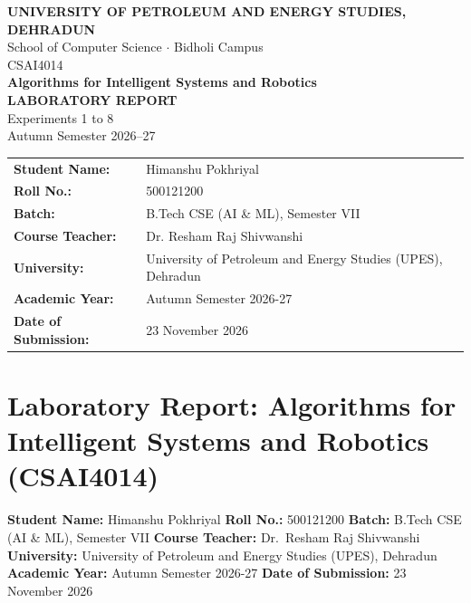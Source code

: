 \documentclass[
]{article}
\author{}
\date{}
\begin{document}
\begin{titlepage}
\centering
\vspace*{2cm}
{\Large \textbf{UNIVERSITY OF PETROLEUM AND ENERGY STUDIES, DEHRADUN}}\\
{\large School of Computer Science $\cdot$ Bidholi Campus}\\[1.5cm]
{\Large CSAI4014}\\[0.5cm]
{\LARGE \textbf{Algorithms for Intelligent Systems and Robotics}}\\[0.5cm]
{\Large \textbf{LABORATORY REPORT}}\\[0.3cm]
{\large Experiments 1 to 8}\\[0.3cm]
{\large Autumn Semester 2026--27}\\[2cm]

\begin{tabular}{ll}
\textbf{Student Name:} & Himanshu Pokhriyal \\
\textbf{Roll No.:} & 500121200 \\
\textbf{Batch:} & B.Tech CSE (AI \& ML), Semester VII \\
\textbf{Course Teacher:} & Dr. Resham Raj Shivwanshi \\
\textbf{University:} & University of Petroleum and Energy Studies (UPES), Dehradun \\
\textbf{Academic Year:} & Autumn Semester 2026-27 \\
\textbf{Date of Submission:} & 23 November 2026 \\
\end{tabular}

\vfill
\end{titlepage}

\newpage
\tableofcontents
\newpage
\listoffigures
\newpage
\listoftables
\newpage

\newpage

\section{Laboratory Report: Algorithms for Intelligent Systems and
Robotics
(CSAI4014)}\label{laboratory-report-algorithms-for-intelligent-systems-and-robotics-csai4014}

\textbf{Student Name:} Himanshu Pokhriyal \textbf{Roll No.:} 500121200
\textbf{Batch:} B.Tech CSE (AI \& ML), Semester VII \textbf{Course
Teacher:} Dr.~Resham Raj Shivwanshi \textbf{University:} University of
Petroleum and Energy Studies (UPES), Dehradun \textbf{Academic Year:}
Autumn Semester 2026-27 \textbf{Date of Submission:} 23 November 2026
\end{document}
